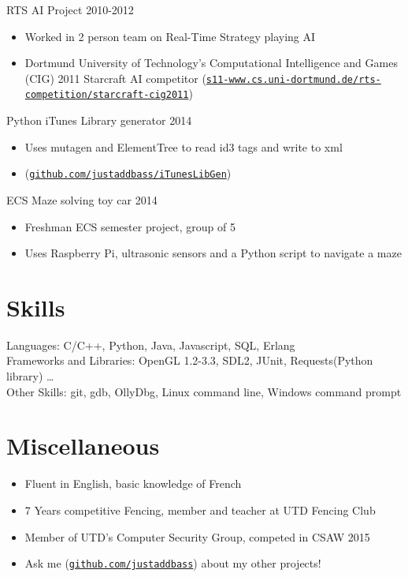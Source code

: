 \documentclass[line,margin]{res}
\begin{document}
\begin{resume}
\vspace{6pt}
RTS AI Project
\hfill 2010-2012
	\begin{itemize} \itemsep -2pt
	\item Worked in 2 person team on Real-Time Strategy playing AI
	\item Dortmund University of Technology’s Computational Intelligence and Games (CIG) 2011 Starcraft AI
        competitor (\href{https://www.s11-www.cs.uni-dortmund.de/rts-competition/starcraft-cig2011}{\texttt{s11-www.cs.uni-dortmund.de/rts-competition/starcraft-cig2011}})
	\end{itemize}

\vspace{6pt}
Python iTunes Library generator
\hfill 2014
	\begin{itemize} \itemsep -2pt
	\item Uses mutagen and ElementTree to read id3 tags and write to xml
	\item (\href{https://github.com/justaddbass/iTunesLibGen}{\texttt{github.com/justaddbass/iTunesLibGen}})
	\end{itemize}

\vspace{6pt}
ECS Maze solving toy car
\hfill 2014
	\begin{itemize} \itemsep -2pt
	\item Freshman ECS semester project, group of 5
	\item Uses Raspberry Pi, ultrasonic sensors and a Python script to navigate a maze
	\end{itemize}

\vspace{8pt}
\section{Skills}
\vspace{12pt}
	Languages: C/C++, Python, Java, Javascript, SQL, Erlang \\
	Frameworks and Libraries: OpenGL 1.2-3.3, SDL2, JUnit, Requests(Python library) \ldots \\
	Other Skills: git, gdb, OllyDbg, Linux command line, Windows command prompt

\vspace{8pt}
\section{Miscellaneous}
\vspace{22pt}
	\begin{itemize} \itemsep -2pt
	\item Fluent in English, basic knowledge of French
	\item 7 Years competitive Fencing, member and teacher at UTD Fencing Club
	\item Member of UTD's Computer Security Group, competed in CSAW 2015
	\item Ask me (\href{https://github.com/justaddbass}{\texttt{github.com/justaddbass}}) about my other projects!
	\end{itemize}

\end{resume}
\end{document}
